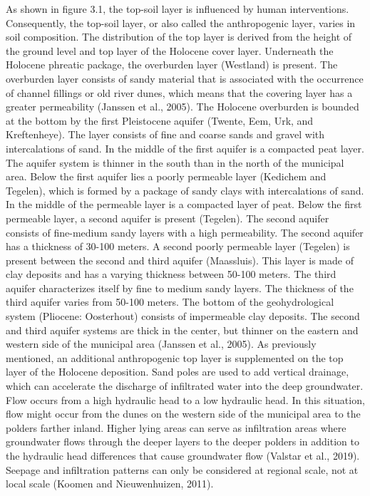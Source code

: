 As shown in figure 3.1, the top-soil layer is influenced by human interventions. Consequently, the top-soil layer, or also called the anthropogenic layer, varies in soil composition. The distribution of the top layer is derived from the height of the ground level and top layer of the Holocene cover layer. Underneath the Holocene phreatic package, the overburden layer (Westland) is present. The overburden layer consists of sandy material that is associated with the occurrence of channel fillings or old river dunes, which means that the covering layer has a greater permeability (Janssen et al., 2005). The Holocene overburden is bounded at the bottom by the first Pleistocene aquifer (Twente, Eem, Urk, and Kreftenheye). The layer consists of fine and coarse sands and gravel with intercalations of sand. In the middle of the first aquifer is a compacted peat layer. The aquifer system is thinner in the south than in the north of the municipal area. Below the first aquifer lies a poorly permeable layer (Kedichem and Tegelen), which is formed by a package of sandy clays with intercalations of sand. In the middle of the permeable layer is a compacted layer of peat. Below the first permeable layer, a second aquifer is present (Tegelen). The second aquifer consists of fine-medium sandy layers with a high permeability. The second aquifer has a thickness of 30-100 meters. A second poorly permeable layer (Tegelen) is present between the second and third aquifer (Maassluis). This layer is made of clay deposits and has a varying thickness between 50-100 meters. The third aquifer characterizes itself by fine to medium sandy layers. The thickness of the third aquifer varies from 50-100 meters. The bottom of the geohydrological system (Pliocene: Oosterhout) consists of impermeable clay deposits. The second and third aquifer systems are thick in the center, but thinner on the eastern and western side of the municipal area (Janssen et al., 2005). As previously mentioned, an additional anthropogenic top layer is supplemented on the top layer of the Holocene deposition. Sand poles are used to add vertical drainage, which can accelerate the discharge of infiltrated water into the deep groundwater. Flow occurs from a high hydraulic head to a low hydraulic head. In this situation, flow might occur from the dunes on the western side of the municipal area to the polders farther inland. Higher lying areas can serve as infiltration areas where groundwater flows through the deeper layers to the deeper polders in addition to the hydraulic head differences that cause groundwater flow (Valstar et al., 2019). Seepage and infiltration patterns can only be considered at regional scale, not at local scale (Koomen and Nieuwenhuizen, 2011). \\
